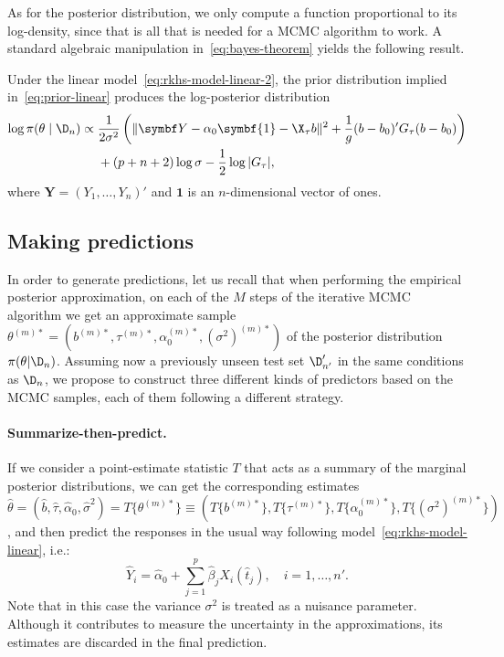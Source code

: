 As for the posterior distribution, we only compute a function proportional to its log-density, since that is all that is needed for a MCMC algorithm to work. A standard algebraic manipulation in~\eqref{eq:bayes-theorem} yields the following result.

\begin{proposition}
Under the linear model~\eqref{eq:rkhs-model-linear-2}, the prior distribution implied in~\eqref{eq:prior-linear} produces the log-posterior distribution
\begin{align*}
\log \pi(\theta \mid \D_n) \propto {} & \frac{1}{2\sigma^2}\left(\|\symbf Y- \alpha_0\symbf{1} - \X_\tau b\|^2 + \frac{1}{g}(b - b_0)'G_\tau(b - b_0) \right)\\
& + (p+n+2)\log\sigma - \frac{1}{2}\log |G_\tau|,
\end{align*}
where \(\symbf Y=(Y_1,\dots,Y_n)'\) and \(\symbf{1}\) is an \(n\)-dimensional vector of ones.
\end{proposition}

\subsection*{Making predictions}

In order to generate predictions, let us recall that when performing the empirical posterior approximation, on each of the \(M\) steps of the iterative MCMC algorithm we get an approximate sample \(\theta^{(m)*}=(b^{(m)*}, \tau^{(m)*}, \alpha_0^{(m)*}, (\sigma^2)^{(m)*})\) of the posterior distribution \(\pi(\theta| \D_n)\). Assuming now a previously unseen test set \(\D'_{n'}\) in the same conditions as \(\D_n\), we propose to construct three different kinds of predictors based on the MCMC samples, each of them following a different strategy.

  \paragraph{Summarize-then-predict.} If we consider a point-estimate statistic \(T\) that acts as a summary of the marginal posterior distributions, we can get the corresponding estimates \(\hat{\theta}=(\hat b, \hat \tau, \hat{\alpha}_0, \hat{\sigma}^2) = T\{\theta^{(m)*}\} \equiv (T\{b^{(m)*}\}, T\{\tau^{(m)*}\}, T\{\alpha_0^{(m)*}\}, T\{(\sigma^2)^{(m)*}\})\), and then predict the responses in the usual way following model~\eqref{eq:rkhs-model-linear}, i.e.:
  \[
    \hat Y_i = \hat{\alpha}_0 + \sum_{j=1}^p \hat{\beta}_j X_i(\hat{t}_j), \quad i=1,\dots, n'.
  \]
  Note that in this case the variance \(\sigma^2\) is treated as a nuisance parameter. Although it contributes to measure the uncertainty in the approximations, its estimates are discarded in the final prediction.

